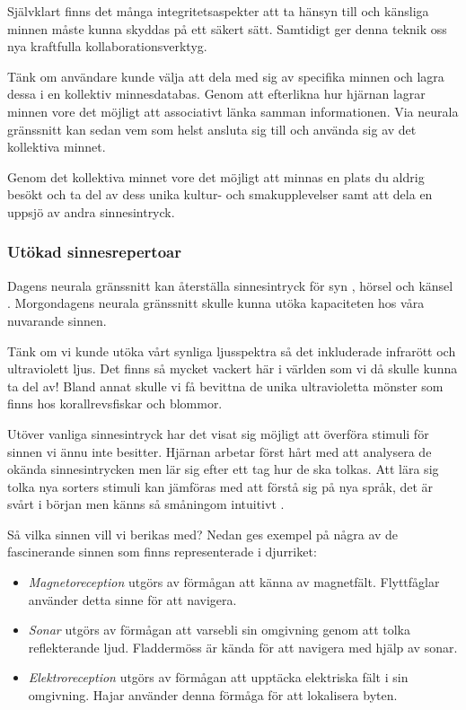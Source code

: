 \documentclass[12pt, a4paper]{article}
\begin{document}
Självklart finns det många integritetsaspekter att ta hänsyn till och känsliga minnen måste kunna skyddas på ett säkert sätt. Samtidigt ger denna teknik oss nya kraftfulla kollaborationsverktyg.

Tänk om användare kunde välja att dela med sig av specifika minnen och lagra dessa i en kollektiv minnesdatabas. Genom att efterlikna hur hjärnan lagrar minnen vore det möjligt att associativt länka samman informationen. Via neurala gränssnitt kan sedan vem som helst ansluta sig till och använda sig av det kollektiva minnet.

Genom det kollektiva minnet vore det möjligt att minnas en plats du aldrig besökt och ta del av dess unika kultur- och smakupplevelser samt att dela en uppsjö av andra sinnesintryck.



\subsubsection{Utökad sinnesrepertoar}

Dagens neurala gränssnitt kan återställa sinnesintryck för syn \cite{sight1}, hörsel \cite{sound} och känsel \cite{touch}. Morgondagens neurala gränssnitt skulle kunna utöka kapaciteten hos våra nuvarande sinnen.

Tänk om vi kunde utöka vårt synliga ljusspektra så det inkluderade infrarött och ultraviolett ljus. Det finns så mycket vackert här i världen som vi då skulle kunna ta del av! Bland annat skulle vi få bevittna de unika ultravioletta mönster som finns hos korallrevsfiskar \cite{uv_patterns} och blommor.

Utöver vanliga sinnesintryck har det visat sig möjligt att överföra stimuli för sinnen vi ännu inte besitter. Hjärnan arbetar först hårt med att analysera de okända sinnesintrycken men lär sig efter ett tag hur de ska tolkas. Att lära sig tolka nya sorters stimuli kan jämföras med att förstå sig på nya språk, det är svårt i början men känns så småningom intuitivt \cite{learn_sense}.

Så vilka sinnen vill vi berikas med? Nedan ges exempel på några av de fascinerande sinnen som finns representerade i djurriket:

\begin{itemize}
	\item \textit{Magnetoreception} utgörs av förmågan att känna av magnetfält. Flyttfåglar använder detta sinne för att navigera.
	\item \textit{Sonar} utgörs av förmågan att varsebli sin omgivning genom att tolka reflekterande ljud. Fladdermöss är kända för att navigera med hjälp av sonar.
	\item \textit{Elektroreception} utgörs av förmågan att upptäcka elektriska fält i sin omgivning. Hajar använder denna förmåga för att lokalisera byten.
\end{itemize}
\end{document}
